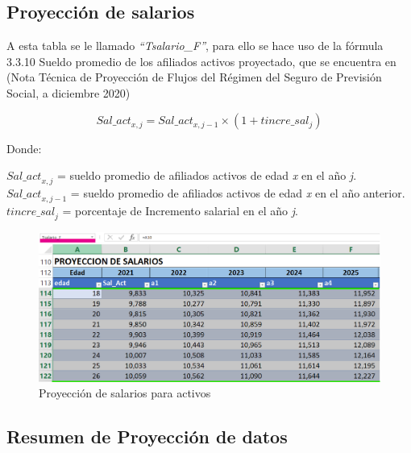 \documentclass[
  letterpaper,
  DIV=11,
  numbers=noendperiod]{scrreprt}
\begin{document}
\hypertarget{proyecciuxf3n-de-salarios}{%
\subsection{Proyección de salarios}\label{proyecciuxf3n-de-salarios}}

A esta tabla se le llamado \emph{``Tsalario\_F''}, para ello se hace uso
de la fórmula 3.3.10 Sueldo promedio de los afiliados activos
proyectado, que se encuentra en (Nota Técnica de Proyección de Flujos
del Régimen del Seguro de Previsión Social, a diciembre 2020)

\begin{equation}
{Sal\_act}_{x,j}= {Sal\_act}_{x,j-1}\times(1+{tincre\_sal}_j)
\end{equation}

Donde:

\({Sal\_act}_{x,j}\) = sueldo promedio de afiliados activos de edad
\emph{x} en el año \emph{j}.\\
\({Sal\_act}_{x,j-1}\) = sueldo promedio de afiliados activos de edad
\emph{x} en el año anterior.\\
\({tincre\_sal}_j\) = porcentaje de Incremento salarial en el año
\emph{j}.

\begin{figure}

{\centering \includegraphics{images/F/Img15.png}

}

\caption{Proyección de salarios para activos}

\end{figure}

\hypertarget{resumen-de-proyecciuxf3n-de-datos}{%
\subsection{Resumen de Proyección de
datos}\label{resumen-de-proyecciuxf3n-de-datos}}
\end{document}
